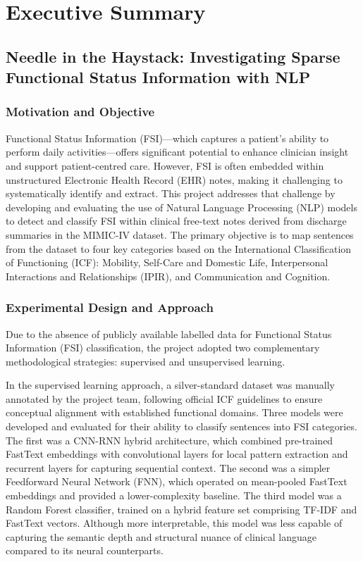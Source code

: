\chapter{Executive Summary}
\section{Needle in the Haystack: Investigating Sparse Functional Status Information with NLP}
\subsection{Motivation and Objective}

Functional Status Information (FSI)—which captures a patient's ability to perform daily activities—offers significant potential to enhance clinician insight and support patient-centred care. However, FSI is often embedded within unstructured Electronic Health Record (EHR) notes, making it challenging to systematically identify and extract. This project addresses that challenge by developing and evaluating the use of Natural Language Processing (NLP) models to detect and classify FSI within clinical free-text notes derived from discharge summaries in the MIMIC-IV dataset. The primary objective is to map sentences from the dataset to four key categories based on the International Classification of Functioning (ICF): Mobility, Self-Care and Domestic Life, Interpersonal Interactions and Relationships (IPIR), and Communication and Cognition.

\subsection{Experimental Design and Approach}
Due to the absence of publicly available labelled data for Functional Status Information (FSI) classification, the project adopted two complementary methodological strategies: supervised and unsupervised learning. \medskip

In the supervised learning approach, a silver-standard dataset was manually annotated by the project team, following official ICF guidelines to ensure conceptual alignment with established functional domains. Three models were developed and evaluated for their ability to classify sentences into FSI categories. The first was a CNN-RNN hybrid architecture, which combined pre-trained FastText embeddings with convolutional layers for local pattern extraction and recurrent layers for capturing sequential context. The second was a simpler Feedforward Neural Network (FNN), which operated on mean-pooled FastText embeddings and provided a lower-complexity baseline. The third model was a Random Forest classifier, trained on a hybrid feature set comprising TF-IDF and FastText vectors. Although more interpretable, this model was less capable of capturing the semantic depth and structural nuance of clinical language compared to its neural counterparts. \medskip

